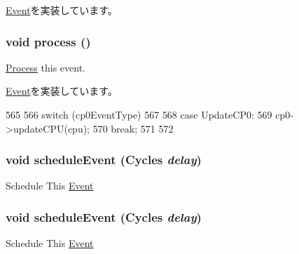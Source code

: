 \hyperlink{classEvent_a142b75b68a6291400e20fb0dd905b1c8}{Event}を実装しています。\hypertarget{classMipsISA_1_1ISA_1_1CP0Event_a2e9c5136d19b1a95fc427e0852deab5c}{
\subsubsection[{process}]{\setlength{\rightskip}{0pt plus 5cm}void process ()}}
\label{classMipsISA_1_1ISA_1_1CP0Event_a2e9c5136d19b1a95fc427e0852deab5c}
\hyperlink{classProcess}{Process} this event. 

\hyperlink{classEvent_a142b75b68a6291400e20fb0dd905b1c8}{Event}を実装しています。


\begin{DoxyCode}
565 {
566     switch (cp0EventType)
567     {
568       case UpdateCP0:
569         cp0->updateCPU(cpu);
570         break;
571     }
572 }
\end{DoxyCode}
\hypertarget{classMipsISA_1_1ISA_1_1CP0Event_af53dcbdc9da1cc615d43ff3bd2b4162c}{
\subsubsection[{scheduleEvent}]{\setlength{\rightskip}{0pt plus 5cm}void scheduleEvent ({\bf Cycles} {\em delay})}}
\label{classMipsISA_1_1ISA_1_1CP0Event_af53dcbdc9da1cc615d43ff3bd2b4162c}
Schedule This \hyperlink{classEvent}{Event} \hypertarget{classMipsISA_1_1ISA_1_1CP0Event_af53dcbdc9da1cc615d43ff3bd2b4162c}{
\subsubsection[{scheduleEvent}]{\setlength{\rightskip}{0pt plus 5cm}void scheduleEvent ({\bf Cycles} {\em delay})}}
\label{classMipsISA_1_1ISA_1_1CP0Event_af53dcbdc9da1cc615d43ff3bd2b4162c}
Schedule This \hyperlink{classEvent}{Event} 


